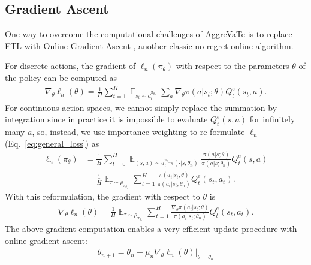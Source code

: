 \documentclass{article}
\newcommand{\BB}[1]{\textcolor{red}{\bf Byron: {#1}}}
\begin{document}
\subsection{Gradient Ascent}
One way to overcome the computational challenges of AggreVaTe is to replace FTL with Online Gradient Ascent \cite{Zinkevich2003_ICML}, another classic no-regret online algorithm. %

For discrete actions, the gradient of $\ell_n(\pi_{\theta})$ with respect to the parameters $\theta$ of the policy can be computed as
\begin{align}
\label{eq:regular_dic_gradient}
\nabla_{\theta}\ell_n(\theta) =\frac{1}{H} \sum_{t=1}^H\mathop{\mathbb{E}}_{s_t\sim d_t^{\pi_{\theta_n}}}\sum_{a}\nabla_{\theta}\pi(a|s_t;\theta) Q_t^e(s_t, a).
\end{align}
For continuous action spaces, we cannot simply replace the summation by integration since in practice it is impossible to evaluate $Q_t^e(s,a)$ for infinitely many $a$, %
so, instead, we use importance weighting to re-formulate $\ell_n$ (Eq.~\ref{eq:general_loss}) as
\begin{align}
\ell_n(\pi_{\theta})&=\frac{1}{H}\sum_{t=0}^H\mathop{\mathbb{E}}_{(s,a)\sim d_t^{\pi_{\theta_n}}\pi(\cdot|s;\theta_n)}\frac{\pi(a|s;\theta)}{\pi(a|s;\theta_n)}Q^e_t(s,a) \nonumber \\
&= \frac{1}{H}\mathop{\mathbb{E}}_{\tau\sim\rho_{\pi_{\theta_n}}}\sum_{t=1}^H \frac{\pi(a_t|s_t;\theta)}{\pi(a_t|s_t;\theta_n)}Q^e_t(s_t,a_t).
\end{align} 
With this reformulation, the gradient with respect to $\theta$ is
\begin{align}
\label{eq:regular_con_gradient}
\nabla_{\theta}\ell_n(\theta) =\frac{1}{H} \mathop{\mathbb{E}}_{\tau\sim\rho_{\pi_{\theta_n}}}\sum_{t=1}^H \frac{\nabla_{\theta}\pi(a_t|s_t;\theta)}{\pi(a_t|s_t;\theta_n)}Q^e_t(s_t,a_t).
\end{align}
The above gradient computation enables a very efficient update procedure with online gradient ascent:
\begin{align}
\label{eq:ogd_form}
\theta_{n+1} = \theta_n + \mu_n \nabla_{\theta}\ell_n(\theta)|_{\theta = \theta_n}
\end{align}
\end{document}

